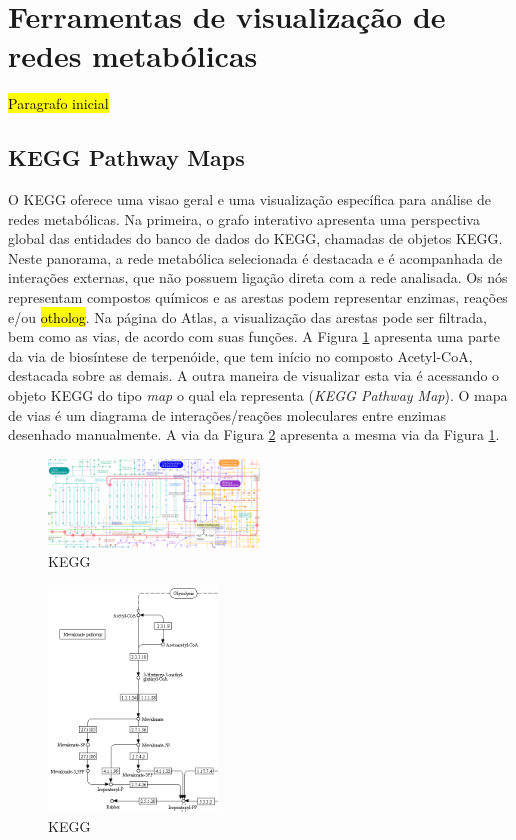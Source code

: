 \documentclass[conference]{IEEEtran}
\begin{document}
\section{Ferramentas de visualização de redes metabólicas}

\hl{Paragrafo inicial}

\subsection{KEGG Pathway Maps}

O KEGG oferece uma visao geral e uma visualização específica para análise de redes metabólicas. Na primeira, o grafo interativo apresenta uma perspectiva global das entidades do banco de dados do KEGG, chamadas de objetos KEGG. Neste panorama, a rede metabólica selecionada é destacada e é acompanhada de interações externas, que não possuem ligação direta com a rede analisada. Os nós representam compostos químicos e as arestas podem representar enzimas, reações e/ou \hl{otholog}. Na página do Atlas, a visualização das arestas pode ser filtrada, bem como as vias, de acordo com suas funções. A Figura \ref{terpenoid_meva_kegg} apresenta uma parte da via de biosíntese de terpenóide, que tem início no composto Acetyl-CoA, destacada sobre as demais. A outra maneira de visualizar esta via é acessando o objeto KEGG do tipo \textit{map} o qual ela representa (\textit{KEGG Pathway Map}). O mapa de vias é um diagrama de interações/reações moleculares entre enzimas desenhado manualmente. A via da Figura \ref{terpenoid_meva_kegg_solo} apresenta a mesma via da Figura \ref{terpenoid_meva_kegg}. \\

\begin{figure}[!t]
\centering
\includegraphics[width=0.5\textwidth]{terpenoid_meva_kegg.png}
\caption{KEGG}
\label{terpenoid_meva_kegg}
\end{figure}

\begin{figure}[!t]
\centering
\includegraphics[width=0.4\textwidth]{terpenoid_meva_kegg_solo.png}
\caption{KEGG}
\label{terpenoid_meva_kegg_solo}
\end{figure}
\end{document}
